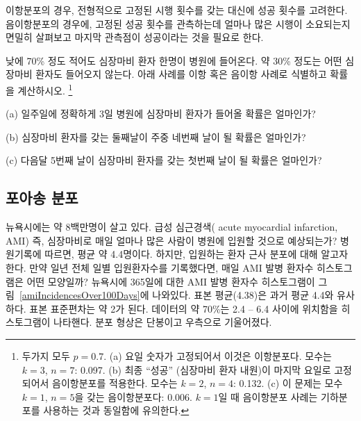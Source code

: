 \begin{tipBox}{
이항분포의 경우, 전형적으로 고정된 시행 횟수를 갖는 대신에 성공 횟수를 고려한다. 음이항분포의 경우에, 고정된 성공 횟수를 관측하는데 얼마나 많은 시행이 소요되는지 면밀히 살펴보고 마지막 관측점이 성공이라는 것을 필요로 한다.}
\end{tipBox}

\begin{exercise}
 낮에 70\% 정도 적어도 심장마비 환자 한명이 병원에  들어온다. 약 30\% 정도는 어떤 심장마비 환자도 들어오지 않는다. 아래 사례를 이항 혹은 음이항 사례로 식별하고 확률을 계산하시오.
 \footnote{두가지 모두 $p=0.7$. 
 (a) 요일 숫자가 고정되어서 이것은 이항분포다. 모수는 $k=3$, $n=7$: 0.097. (b) 최종 ``성공'' (심장마비 환자 내원)이 마지막 요일로 고정되어서 음이항분포를 적용한다. 모수는 $k=2$, $n=4$: 0.132. 
 (c) 이 문제는 모수 $k=1$, $n=5$을 갖는 음이항분포다: 0.006. $k=1$일 때 음이항분포 사례는 기하분포를 사용하는 것과 동일함에 유의한다.}

(a) 일주일에 정확하게 3일 병원에 심장마비 환자가 들어올 확률은 얼마인가?

(b) 심장마비 환자를 갖는 둘째날이 주중 네번째 날이 될 확률은 얼마인가?

(c) 다음달 5번째 날이 심장마비 환자를 갖는 첫번째 날이 될 확률은 얼마인가?
\end{exercise}


\textC{\pagebreak}


\subsection{포아송 분포}
\label{poisson}


\begin{example}{
뉴욕시에는 약 8백만명이 살고 있다. 급성 심근경색( acute myocardial infarction, AMI) 즉, 심장마비로 매일 얼마나 많은 사람이 병원에 입원할 것으로 예상되는가? 병원기록에 따르면, 평균 약 4.4명이다. 하지만, 입원하는 환자 근사 분포에 대해 알고자 한다. 만약 일년 전체 일별 입원환자수를 기록했다면, 매일 AMI 발병 환자수 히스토그램은 어떤 모양일까?} \label{amiIncidencesEachDayOver1YearInNYCExample}
뉴욕시에 365일에 대한 AMI 발병 환자수 히스토그램이 그림~\ref{amiIncidencesOver100Days}에 나와있다. 표본 평균(4.38)은 과거 평균 4.4와 유사하다. 표본 표준편차는 약 2가 된다. 데이터의 약 70\%는 2.4 -- 6.4 사이에 위치함을 히스토그램이 나타핸다. 분포 형상은 단봉이고 우측으로 기울어졌다.
\end{example}

